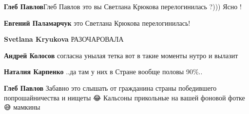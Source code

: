 \begin{itemize}
\begin{itemize}
 
\textbf{Глеб Павлов}Глеб Павлов это вы Светлана Крюкова перелогинилась ?))) Ясно !

 
\textbf{Евгений Паламарчук} это Светлана Крюкова перелогинилась!

 
\textbf{Svetlana Kryukova} РАЗОЧАРОВАЛА🙈😥

 
\textbf{Андрей Колосов} согласна унылая тетка вот в такие моменты нутро и вылазит

 
\textbf{Наталия Карпенко} ..да там у них в Стране вообще половы 90\%..

 
\textbf{Глеб Павлов} Забавно это слышать от гражданина страны победившего попрошайничества и нищеты 😂 Кальсоны прикольные на вашей фоновой фотке 😅 мамкины

 

\end{itemize}
\end{itemize}
